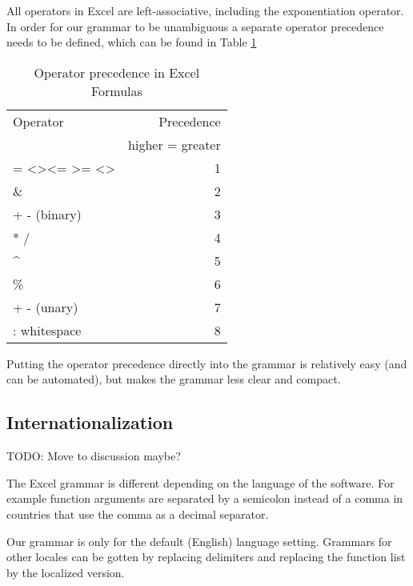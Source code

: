 \documentclass[conference]{IEEEtran}
\begin{document}
All operators in Excel are left-associative, including the exponentiation operator. In order for our grammar to be unambiguous a separate operator precedence needs to be defined, which can be found in Table \ref{table:operatorprec}

\begin{table}
\label{table:operatorprec}
\caption{Operator precedence in Excel Formulas}
\begin{tabular}{lr}
Operator                                                                & Precedence \\
 & higher = greater \\
= \textless \textgreater \textless= \textgreater= \textless\textgreater & 1          \\
\&                                                                      & 2          \\
+ - (binary)                                                            & 3          \\
* /                                                                     & 4          \\
\textasciicircum                                                        & 5          \\
\%                                                                      & 6          \\
+ - (unary)                                                             & 7          \\
: whitespace                                                            & 8         
\end{tabular}
\end{table}

Putting the operator precedence directly into the grammar is relatively easy (and can be automated), but makes the grammar less clear and compact.

\subsection{Internationalization}

TODO: Move to discussion maybe?

The Excel grammar is different depending on the language of the software. For example function arguments are separated by a semicolon instead of a comma in countries that use the comma as a decimal separator.

Our grammar is only for the default (English) language setting. Grammars for other locales can be gotten by replacing delimiters and replacing the function list by the localized version.
\end{document}

